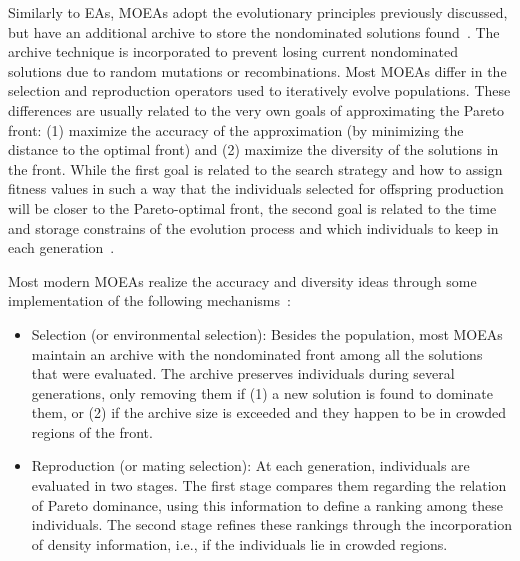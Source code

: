 	Similarly to \acp{EA}, \acp{MOEA} adopt the evolutionary principles previously discussed, but have an additional archive to store the nondominated solutions found~\cite{Zitzler2001SPEA2}. The archive technique is incorporated to prevent losing current nondominated solutions due to random mutations or recombinations. Most \acp{MOEA} differ in the selection and reproduction operators used to iteratively evolve populations. These differences are usually related to the very own goals of approximating the Pareto front: (1) maximize the accuracy of the approximation (by minimizing the distance to the optimal front) and (2) maximize the diversity of the solutions in the front. While the first goal is related to the search strategy and how to assign fitness values in such a way that the individuals selected for offspring production will be closer to the Pareto-optimal front, the second goal is related to the time and storage constrains of the evolution process and which individuals to keep in each generation~\cite{Zitzler2001SPEA2}.
	
	Most modern \acp{MOEA} realize the accuracy and diversity ideas through some implementation of the following mechanisms~\cite{Zitzler2001SPEA2}:	
	\begin{itemize}
		\item Selection (or environmental selection): Besides the population, most \acp{MOEA} maintain an archive with the nondominated front among all the solutions that were evaluated. The archive preserves individuals during several generations, only removing them if (1) a new solution is found to dominate them, or (2) if the archive size is exceeded and they happen to be in crowded regions of the front.
		
		\item Reproduction (or mating selection): At each generation, individuals are evaluated in two stages. The first stage compares them regarding the relation of Pareto dominance, using this information to define a ranking among these individuals. The second stage refines these rankings through the incorporation of density information, i.e., if the individuals lie in crowded regions.
	\end{itemize}
	
